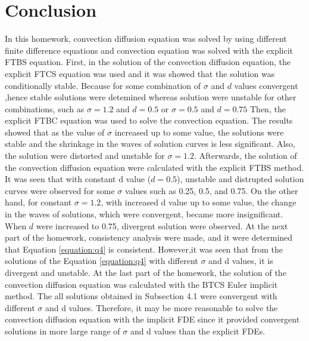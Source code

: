 \documentclass[letterpaper,12pt]{article}
\begin{document}
\section{Conclusion}
In this homework, convection diffusion equation was solved by using different
finite difference equations and convection equation was solved with the explicit
FTBS equation. First, in the solution of the convection diffusion equation,
the explicit FTCS equation was used and it was showed that the solution was
conditionally stable. Because for some combination of $\sigma$ and $d$ values
convergent ,hence stable solutions were detemined whereas solution were unstable
for other combinations, such as $\sigma =1.2$ and $d=0.5$ or  $\sigma =0.5$ and $d=0.75$
Then, the explicit FTBC equation was used to solve the convection equation. The results showed
that as the value of $\sigma$ increased up to some value, the solutions were stable and 
the shrinkage in the waves of solution curves is less significant. Also, the solution
were distorted and unstable for $\sigma=1.2$. Afterwards, the solution of the convection
diffusion equation were calculated with the explicit FTBS method. It was seen that
with constant d value ($d=0.5$), unstable and distrupted solution curves were observed
for some $\sigma$ values such as 0.25, 0.5, and 0.75. On the other hand, for constant 
$\sigma=1.2$, with increased d value up to some value, the change in the waves of solutions,
which were convergent, became more insignificant. When $d$ were increased to 0.75, divergent
solution were observed. At the next part of the homework, consistency analysis were made,
and it were determined that Equation \ref{equation:q4} is consistent. However,it was seen that
from the solutions of the Equation \ref{equation:q4} with different $\sigma$ and d values,
it is divergent and unstable. At the last part of the homework, the solution of the convection
diffusion equation was calculated with the BTCS Euler implicit method. The all solutions obtained in
Subsection 4.1 were convergent with different $\sigma$ and d values. Therefore, it may be more
reasonable to solve the convection diffusion equation with the implicit FDE since it provided convergent
solutions in more large range of $\sigma$ and d values than the explicit FDEs.
\end{document}
